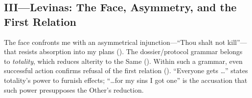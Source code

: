 \subsection*{III—Levinas: The Face, Asymmetry, and the First Relation}
\label{ssec:iii-levinas}
The face confronts me with an asymmetrical injunction—“Thou shalt not kill”—that resists absorption into my plans (\parencite[pp.~33, 199]{LevinasTI1969}). The dossier/protocol grammar belongs to \emph{totality}, which reduces alterity to the Same (\parencite[pp.~21--24, 33--36]{LevinasTI1969}). Within such a grammar, even successful action confirms refusal of the first relation (\parencite[pp.~215--219]{LevinasTI1969}). “Everyone gets …” states totality’s power to furnish effects; “…for my sins I got one” is the accusation that such power presupposes the Other’s reduction.
